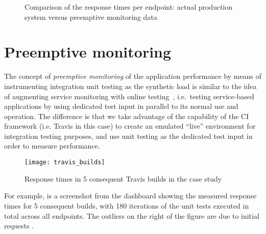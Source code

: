 
  \begin{figure*}[h!]
  \centering
  \quad
  \caption{Comparison of the response times per endpoint: actual production system versus preemptive monitoring data}
  \label{fig:preemptive}
\end{figure*}

  \section{Preemptive monitoring}

  
  
  The concept of {\em preemptive monitoring} of the application performance by means of instrumenting integration unit testing as the synthetic load is similar to the idea of augmenting service monitoring with online testing~\cite{metzger2010proactive}, i.e.~testing service-based applications by using dedicated test input in parallel to its normal use and operation. The difference is that we take advantage of the capability of the CI framework (i.e. Travis in this case) to create an emulated ``live'' environment for integration testing purposes, and use unit testing as the dedicated test input in order to measure performance. 
  

      \begin{figure}[h!]
        \centering
        \texttt{[image: travis\_builds]}
        \caption{Response times in 5 consequent Travis builds in the \zee case study}
        \label{fig:builds}
      \end{figure}



  For example,  is a screenshot from the dashboard showing the measured response times for 5 consequent builds, with 180 iterations of the unit tests executed in total across all endpoints. The outliers on the right of the figure are due to initial requests .  



